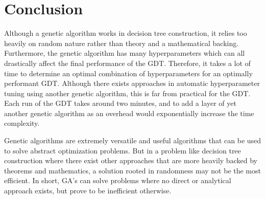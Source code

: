 \documentclass[12pt]{article}
\begin{document}
\section{Conclusion}

Although a genetic algorithm works in decision tree construction, it relies too heavily on random nature rather than theory and a mathematical backing. Furthermore, the genetic algorithm has many hyperparameters which can all drastically affect the final performance of the GDT. Therefore, it takes a lot of time to determine an optimal combination of hyperparameters for an optimally performant GDT. Although there exists approaches in automatic hyperparameter tuning using another genetic algorithm, this is far from practical for the GDT. Each run of the GDT takes around two minutes, and to add a layer of yet another genetic algorithm as an overhead would exponentially increase the time complexity.

Genetic algorithms are extremely versatile and useful algorithms that can be used to solve abstract optimization problems. But in a problem like decision tree construction where there exist other approaches that are more heavily backed by theorems and mathematics, a solution rooted in randomness may not be the most efficient. In short, GA's can solve problems where no direct or analytical approach exists, but prove to be inefficient otherwise.



\end{document}
